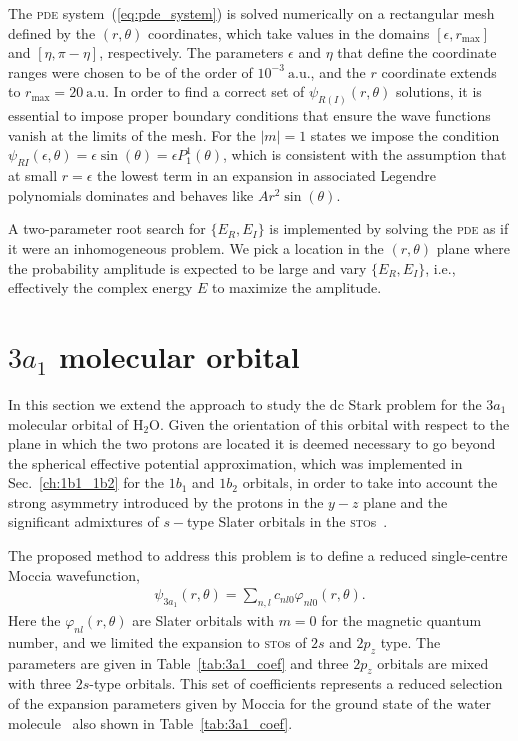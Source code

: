 The \textsc{pde} system~(\ref{eq:pde_system}) is solved numerically on
a rectangular mesh defined by the $(r, \theta)$ coordinates, which
take values in the domains $[\epsilon, r_{\mathrm{max}}]$ and
$[\eta,\pi - \eta]$, respectively. The parameters $\epsilon$ and
$\eta$ that define the coordinate ranges were chosen to be of the
order of $10^{-3}\ \mathrm{a.u.}$, and the $r$ coordinate extends to
$r_{\mathrm{max}} = 20\ \mathrm{a.u.}$ In order to find a correct set
of $\psi_{R(I)}(r,\theta)$ solutions, it is essential to impose proper
boundary conditions that ensure the wave functions vanish at the
limits of the mesh. For the $|m| = 1$ states we impose the condition
$\psi_{R{I}}(\epsilon,\theta) = \epsilon \sin(\theta) = \epsilon
P_{1}^{1}(\theta)$, which is consistent with the assumption that at
small $r = \epsilon$ the lowest term in an expansion in associated
Legendre polynomials dominates and behaves like $A r^{2}
\sin(\theta)$.

A two-parameter root search for $\{E_{R}, E_{I}\}$ is implemented by
solving the \textsc{pde} as if it were an inhomogeneous problem. We
pick a location in the $(r,\theta)$ plane where the probability
amplitude is expected to be large and vary $\{E_{R}, E_{I}\}$, i.e.,
effectively the complex energy $E$ to maximize the amplitude.


\section{$3a_{1}$ molecular orbital}
\label{ch:3a1}

In this section we extend the approach to study the dc Stark problem
for the $3a_{1}$ molecular orbital of H$_{2}$O. Given the orientation
of this orbital with respect to the plane in which the two protons are
located it is deemed necessary to go beyond the spherical effective
potential approximation, which was implemented in
Sec.~\ref{ch:1b1_1b2} for the $1b_{1}$ and $1b_{2}$ orbitals, in order
to take into account the strong asymmetry introduced by the protons in
the $y-z$ plane and the significant admixtures of $s-$type Slater
orbitals in the \textsc{sto}s~\cite{Moccia_1964}.

The proposed method to address this problem is to define a reduced
single-centre Moccia wavefunction,
%
\begin{eqnarray}
\psi_{3a_{1}}(r,\theta) = \sum_{n,l} c_{nl0} \varphi_{nl0}(r,\theta).
\label{eq:3a1Moccia_expansion}
\end{eqnarray}
%
Here the $\varphi_{nl}(r,\theta)$ are Slater orbitals with $m=0$ for
the magnetic quantum number, and we limited the expansion to
\textsc{sto}s of $2s$ and $2p_{z}$ type. The parameters are given in
Table~\ref{tab:3a1_coef} and three $2p_{z}$ orbitals are mixed with
three $2s$-type orbitals. This set of coefficients represents a
reduced selection of the expansion parameters given by Moccia for the
ground state of the water molecule~\cite{Moccia_1964} also shown in
Table~\ref{tab:3a1_coef}.

